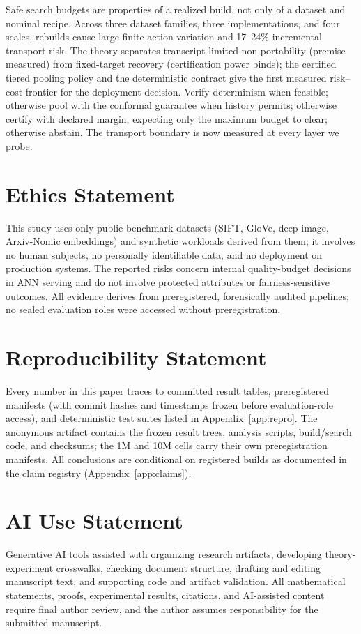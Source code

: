 \documentclass{article}
\begin{document}
Safe search budgets are properties of a realized build, not only of a dataset and nominal recipe.
Across three dataset families, three implementations, and four scales, rebuilds cause large
finite-action variation and 17--24\% incremental transport risk. The theory separates
transcript-limited non-portability (premise measured) from fixed-target recovery (certification power
binds); the certified tiered pooling policy and the deterministic contract give the first measured
risk--cost frontier for the deployment decision. Verify determinism when feasible; otherwise pool with the conformal guarantee when history permits;
otherwise certify with declared margin, expecting only the maximum budget to clear; otherwise abstain.
The transport boundary is now measured at every layer we probe.

\section*{Ethics Statement}
This study uses only public benchmark datasets (SIFT, GloVe, deep-image, Arxiv-Nomic embeddings) and
synthetic workloads derived from them; it involves no human subjects, no personally identifiable data,
and no deployment on production systems. The reported risks concern internal quality-budget decisions in
ANN serving and do not involve protected attributes or fairness-sensitive outcomes. All evidence derives
from preregistered, forensically audited pipelines; no sealed evaluation roles were accessed without
preregistration.

\section*{Reproducibility Statement}
Every number in this paper traces to committed result tables, preregistered manifests (with commit
hashes and timestamps frozen before evaluation-role access), and deterministic test suites listed in
Appendix~\ref{app:repro}. The anonymous artifact contains the frozen result trees, analysis scripts,
build/search code, and checksums; the 1M and 10M cells carry their own preregistration manifests. All
conclusions are conditional on registered builds as documented in the claim registry
(Appendix~\ref{app:claims}).

\section*{AI Use Statement}
Generative AI tools assisted with organizing research artifacts, developing theory-experiment
crosswalks, checking document structure, drafting and editing manuscript text, and supporting code and
artifact validation. All mathematical statements, proofs, experimental results, citations, and
AI-assisted content require final author review, and the author assumes responsibility for the submitted
manuscript.
\end{document}
